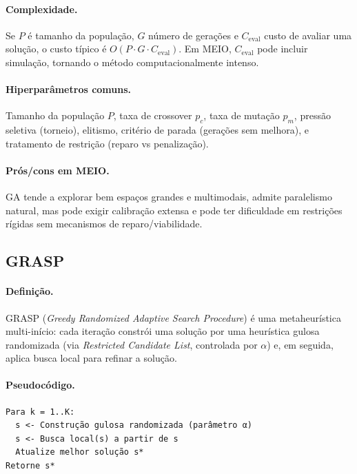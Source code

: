 \paragraph{Complexidade.}
Se \(P\) é tamanho da população, \(G\) número de gerações e \(C_{\text{eval}}\) custo de avaliar uma solução, o custo típico é \(O(P \cdot G \cdot C_{\text{eval}})\). Em MEIO, \(C_{\text{eval}}\) pode incluir simulação, tornando o método computacionalmente intenso.

\paragraph{Hiperparâmetros comuns.}
Tamanho da população \(P\), taxa de crossover \(p_c\), taxa de mutação \(p_m\), pressão seletiva (torneio), elitismo, critério de parada (gerações sem melhora), e tratamento de restrição (reparo vs penalização). \cite{Talbi2009Metaheuristics}

\paragraph{Prós/cons em MEIO.}
GA tende a explorar bem espaços grandes e multimodais, admite paralelismo natural, mas pode exigir calibração extensa e pode ter dificuldade em restrições rígidas sem mecanismos de reparo/viabilidade.

\subsection{GRASP}

\paragraph{Definição.}
GRASP (\emph{Greedy Randomized Adaptive Search Procedure}) é uma metaheurística multi-início: cada iteração constrói uma solução por uma heurística gulosa randomizada (via \emph{Restricted Candidate List}, controlada por \(\alpha\)) e, em seguida, aplica busca local para refinar a solução. \cite{FeoResende1995GRASP}

\paragraph{Pseudocódigo.}
\begin{verbatim}
Para k = 1..K:
  s <- Construção gulosa randomizada (parâmetro α)
  s <- Busca local(s) a partir de s
  Atualize melhor solução s*
Retorne s*
\end{verbatim}

